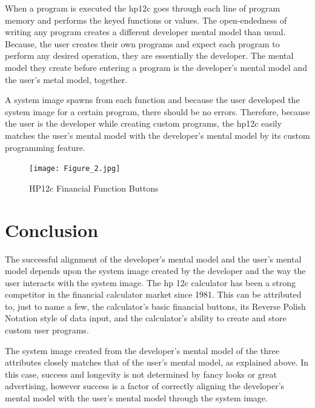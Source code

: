 \documentclass{article}
\begin{document}
When a program is executed the hp12c goes through each line of program memory and performs the keyed functions or values. The open-endedness of writing any program creates a different developer mental model than usual. Because, the user creates their own programs and expect each program to perform any desired operation, they are essentially the developer. The mental model they create before entering a program is the developer's mental model and the user's metal model, together. 

A system image spawns from each function and because the user developed the system image for a certain program, there should be no errors. Therefore, because the user is the developer while creating custom programs, the hp12c easily matches the user's mental model with the developer's mental model by its custom programming feature.

\begin{figure}
\centering
\texttt{[image: Figure\_2.jpg]}
\caption{HP12c Financial Function Buttons}
\label{HP12c Program Mode}
\end{figure}


\section{Conclusion}

The successful alignment of the developer's mental model and the user's mental model depends upon the system image created by the developer and the way the user interacts with the system image. The hp 12c calculator has been a strong competitor in the financial calculator market since 1981. This can be attributed to, just to name a few, the calculator's basic financial buttons, its Reverse Polish Notation style of data input, and the calculator's ability to create and store custom user programs.

 The system image created from the developer's mental model of the three attributes closely matches that of the user's mental model, as explained above. In this case, success and longevity is not determined by fancy looks or great advertising, however success is a factor of correctly aligning the developer's mental model with the user's mental model through the system image.



\end{document}
